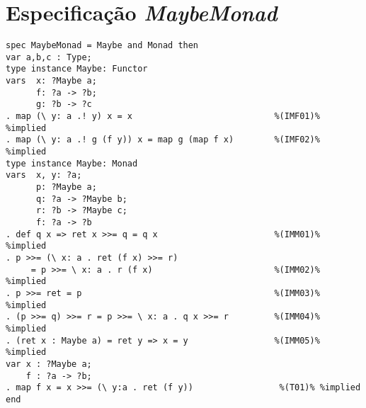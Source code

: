 \section{Especificação \textit{MaybeMonad}}
\label{appendix:lazySpec:maybeMonad}
\begin{Verbatim}
spec MaybeMonad = Maybe and Monad then
var a,b,c : Type;
type instance Maybe: Functor
vars  x: ?Maybe a;
      f: ?a -> ?b;
      g: ?b -> ?c
. map (\ y: a .! y) x = x                            %(IMF01)% %implied
. map (\ y: a .! g (f y)) x = map g (map f x)        %(IMF02)% %implied
type instance Maybe: Monad
vars  x, y: ?a;
      p: ?Maybe a;
      q: ?a -> ?Maybe b;
      r: ?b -> ?Maybe c;
      f: ?a -> ?b
. def q x => ret x >>= q = q x                       %(IMM01)% %implied
. p >>= (\ x: a . ret (f x) >>= r)
     = p >>= \ x: a . r (f x)                        %(IMM02)% %implied
. p >>= ret = p                                      %(IMM03)% %implied
. (p >>= q) >>= r = p >>= \ x: a . q x >>= r         %(IMM04)% %implied
. (ret x : Maybe a) = ret y => x = y                 %(IMM05)% %implied
var x : ?Maybe a;
    f : ?a -> ?b;
. map f x = x >>= (\ y:a . ret (f y))                 %(T01)% %implied
end
\end{Verbatim}

